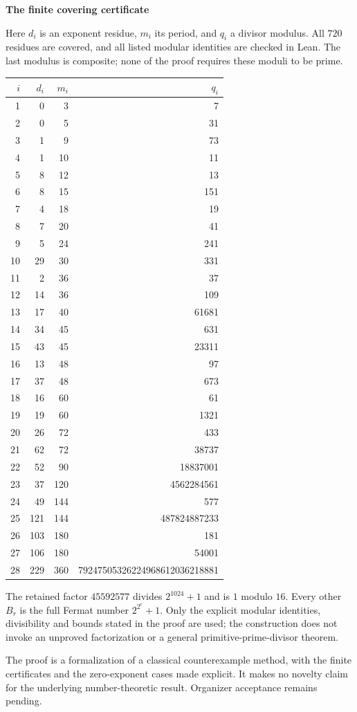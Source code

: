 \documentclass[10pt,a4paper]{article}
\begin{document}
\newpage
\begin{center}\textbf{The finite covering certificate}\end{center}
Here $d_i$ is an exponent residue, $m_i$ its period, and $q_i$ a divisor modulus.
All $720$ residues are covered, and all listed modular identities are checked in Lean.
The last modulus is composite; none of the proof requires these moduli to be prime.
\begin{center}\small
\begin{tabular}{rrrr}
\toprule
$i$&$d_i$&$m_i$&$q_i$\\
\midrule
1 & 0 & 3 & 7 \\
2 & 0 & 5 & 31 \\
3 & 1 & 9 & 73 \\
4 & 1 & 10 & 11 \\
5 & 8 & 12 & 13 \\
6 & 8 & 15 & 151 \\
7 & 4 & 18 & 19 \\
8 & 7 & 20 & 41 \\
9 & 5 & 24 & 241 \\
10 & 29 & 30 & 331 \\
11 & 2 & 36 & 37 \\
12 & 14 & 36 & 109 \\
13 & 17 & 40 & 61681 \\
14 & 34 & 45 & 631 \\
15 & 43 & 45 & 23311 \\
16 & 13 & 48 & 97 \\
17 & 37 & 48 & 673 \\
18 & 16 & 60 & 61 \\
19 & 19 & 60 & 1321 \\
20 & 26 & 72 & 433 \\
21 & 62 & 72 & 38737 \\
22 & 52 & 90 & 18837001 \\
23 & 37 & 120 & 4562284561 \\
24 & 49 & 144 & 577 \\
25 & 121 & 144 & 487824887233 \\
26 & 103 & 180 & 181 \\
27 & 106 & 180 & 54001 \\
28 & 229 & 360 & 79247505326224968612036218881 \\
\bottomrule
\end{tabular}
\end{center}
The retained factor $45592577$ divides $2^{1024}+1$ and is $1$ modulo $16$.
Every other $B_r$ is the full Fermat number $2^{2^r}+1$.
Only the explicit modular identities, divisibility and bounds stated in the proof
are used; the construction does not invoke an unproved factorization or a general
primitive-prime-divisor theorem.

The proof is a formalization of a classical counterexample method, with the finite
certificates and the zero-exponent cases made explicit. It makes no novelty claim
for the underlying number-theoretic result. Organizer acceptance remains pending.
\end{document}
